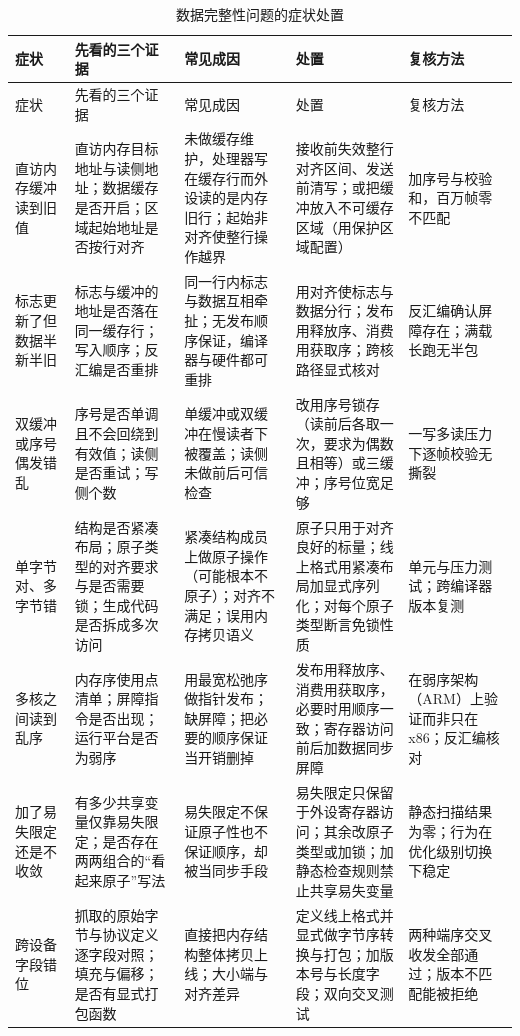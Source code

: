 \documentclass[12pt,a4paper,fontset=fandol]{ctexbook}
\begin{document}
\begin{longtable}{>{\raggedright\arraybackslash\footnotesize}p{}>{\raggedright\arraybackslash\footnotesize}p{}>{\raggedright\arraybackslash\footnotesize}p{}>{\raggedright\arraybackslash\footnotesize}p{}>{\raggedright\arraybackslash\footnotesize}p{}}
\caption{数据完整性问题的症状处置}\label{tab:apC-data} \\
\toprule
症状 & 先看的三个证据 & 常见成因 & 处置 & 复核方法 \\
\midrule
\endfirsthead
\toprule
症状 & 先看的三个证据 & 常见成因 & 处置 & 复核方法 \\
\midrule
\endhead
\bottomrule
\endfoot
\endlastfoot
直访内存缓冲读到旧值 & 直访内存目标地址与读侧地址；数据缓存是否开启；区域起始地址是否按行对齐 & 未做缓存维护，处理器写在缓存行而外设读的是内存旧行；起始非对齐使整行操作越界 & 接收前失效整行对齐区间、发送前清写；或把缓冲放入不可缓存区域（用保护区域配置） & 加序号与校验和，百万帧零不匹配 \\
标志更新了但数据半新半旧 & 标志与缓冲的地址是否落在同一缓存行；写入顺序；反汇编是否重排 & 同一行内标志与数据互相牵扯；无发布顺序保证，编译器与硬件都可重排 & 用对齐使标志与数据分行；发布用释放序、消费用获取序；跨核路径显式核对 & 反汇编确认屏障存在；满载长跑无半包 \\
双缓冲或序号偶发错乱 & 序号是否单调且不会回绕到有效值；读侧是否重试；写侧个数 & 单缓冲或双缓冲在慢读者下被覆盖；读侧未做前后可信检查 & 改用序号锁存（读前后各取一次，要求为偶数且相等）或三缓冲；序号位宽足够 & 一写多读压力下逐帧校验无撕裂 \\
单字节对、多字节错 & 结构是否紧凑布局；原子类型的对齐要求与是否需要锁；生成代码是否拆成多次访问 & 紧凑结构成员上做原子操作（可能根本不原子）；对齐不满足；误用内存拷贝语义 & 原子只用于对齐良好的标量；线上格式用紧凑布局加显式序列化；对每个原子类型断言免锁性质 & 单元与压力测试；跨编译器版本复测 \\
多核之间读到乱序 & 内存序使用点清单；屏障指令是否出现；运行平台是否为弱序 & 用最宽松弛序做指针发布；缺屏障；把必要的顺序保证当开销删掉 & 发布用释放序、消费用获取序，必要时用顺序一致；寄存器访问前后加数据同步屏障 & 在弱序架构（ARM）上验证而非只在 x86；反汇编核对 \\
加了易失限定还是不收敛 & 有多少共享变量仅靠易失限定；是否存在两两组合的``看起来原子''写法 & 易失限定不保证原子性也不保证顺序，却被当同步手段 & 易失限定只保留于外设寄存器访问；其余改原子类型或加锁；加静态检查规则禁止共享易失变量 & 静态扫描结果为零；行为在优化级别切换下稳定 \\
跨设备字段错位 & 抓取的原始字节与协议定义逐字段对照；填充与偏移；是否有显式打包函数 & 直接把内存结构整体拷贝上线；大小端与对齐差异 & 定义线上格式并显式做字节序转换与打包；加版本号与长度字段；双向交叉测试 & 两种端序交叉收发全部通过；版本不匹配能被拒绝 \\
\end{longtable}
\end{document}
